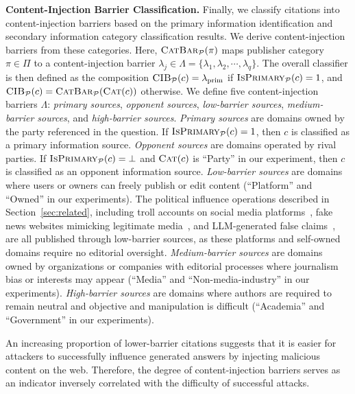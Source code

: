 \textbf{Content-Injection Barrier Classification.}
Finally, we classify citations into content-injection barriers based on the primary information identification and secondary information category classification results.
We derive content-injection barriers from these categories.
Here, $\textsc{CatBar}_{\mathcal{P}}(\pi)$ maps publisher category $\pi \in \Pi$ to a content-injection barrier $\lambda_j \in \Lambda = \{\lambda_1, \lambda_2, \cdots, \lambda_q\}$.
The overall classifier is then defined as the composition $\textsc{CIB}_{\mathcal{P}}(c) = \lambda_{\text{prim}}$ if $\textsc{IsPrimary}_{\mathcal{P}}(c) = 1$, and $\textsc{CIB}_{\mathcal{P}}(c) = \textsc{CatBar}_{\mathcal{P}}(\textsc{Cat}(c))$ otherwise.
We define five content-injection barriers $\Lambda$: \emph{primary sources}, \emph{opponent sources}, \emph{low-barrier sources}, \emph{medium-barrier sources}, and \emph{high-barrier sources}.
\emph{Primary sources} are domains owned by the party referenced in the question. If $\textsc{IsPrimary}_{\mathcal{P}}(c) = 1$, then $c$ is classified as a primary information source.
\emph{Opponent sources} are domains operated by rival parties. If $\textsc{IsPrimary}_{\mathcal{P}}(c) = \bot$ and $\textsc{Cat}(c)$ is ``Party'' in our experiment, then $c$ is classified as an opponent information source.
\emph{Low-barrier sources} are domains where users or owners can freely publish or edit content (``Platform'' and ``Owned'' in our experiments).
The political influence operations described in Section~\ref{sec:related}, including troll accounts on social media platforms~\cite{badawy2018analyzing, zannettou2018disinformation, cinus2025cross, nikkei2025sanseito, nippon2025russian}, fake news websites mimicking legitimate media~\cite{eudisinfolab2022doppelganger, foreignaffairs2024doppelganger}, and LLM-generated false claims~\cite{openai2026disrupting}, are all published through low-barrier sources, as these platforms and self-owned domains require no editorial oversight.
\emph{Medium-barrier sources} are domains owned by organizations or companies with editorial processes where journalism bias or interests may appear (``Media'' and ``Non-media-industry'' in our experiments).
\emph{High-barrier sources} are domains where authors are required to remain neutral and objective and manipulation is difficult (``Academia'' and ``Government'' in our experiments).

An increasing proportion of lower-barrier citations suggests that it is easier for attackers to successfully influence generated answers by injecting malicious content on the web.
Therefore, the degree of content-injection barriers serves as an indicator inversely correlated with the difficulty of successful attacks.

